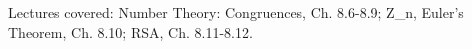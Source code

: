 \documentclass[handout]{mcs}
\begin{document}
\renewcommand{\reading}{ 
\begin{itemize}
\item Chapter~\bref{number_theory_chap}.\ \emph{Number Theory: Congruences}
  through~\bref{RSA_sec}.\ \emph{RSA Cryptosystem}.
\end{itemize}
}


\begin{staffnotes}
Lectures covered: Number Theory: Congruences, Ch. 8.6-8.9; Z_n,
Euler's Theorem, Ch. 8.10; RSA, Ch. 8.11-8.12.
\end{staffnotes}




\end{document}
